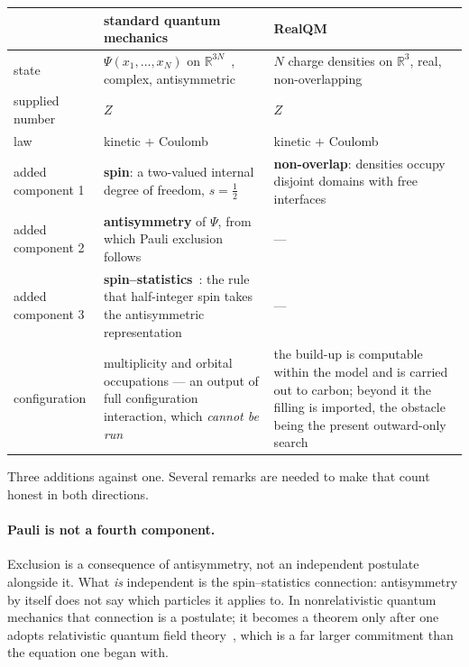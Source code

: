 \documentclass[11pt]{article}
\begin{document}
\begin{center}
\begin{tabular}{p{}p{}p{}}
\toprule
 & standard quantum mechanics & RealQM \\
\midrule
state & $\Psi(x_1,\dots,x_N)$ on $\mathbb{R}^{3N}$~\cite{Schrodinger1926}, complex, antisymmetric
      & $N$ charge densities on $\mathbb{R}^{3}$, real, non-overlapping \\
supplied number & $Z$ & $Z$ \\
law & kinetic $+$ Coulomb & kinetic $+$ Coulomb \\
\midrule
added component 1 & \textbf{spin}: a two-valued internal degree of freedom,
                    $s=\tfrac12$~\cite{UhlenbeckGoudsmit1925,Giulini2008}
                  & \textbf{non-overlap}: densities occupy disjoint domains with free interfaces \\
added component 2 & \textbf{antisymmetry} of $\Psi$, from which Pauli
                    exclusion~\cite{Pauli1925,PauliNobel} follows & --- \\
added component 3 & \textbf{spin--statistics}~\cite{Pauli1940}: the rule that half-integer
                    spin takes the antisymmetric representation & --- \\
\midrule
configuration & multiplicity and orbital occupations --- an output of full configuration
interaction, which \emph{cannot be run} & the build-up is computable within the model and is
carried out to carbon; beyond it the filling is imported, the obstacle being the present
outward-only search \\
\bottomrule
\end{tabular}
\end{center}

Three additions against one. Several remarks are needed to make that count honest in both
directions.

\paragraph{Pauli is not a fourth component.} Exclusion is a consequence of antisymmetry, not an
independent postulate alongside it. What \emph{is} independent is the spin--statistics connection:
antisymmetry by itself does not say which particles it applies to. In nonrelativistic quantum
mechanics that connection is a postulate; it becomes a theorem only after one adopts relativistic
quantum field theory~\cite{Pauli1940}, which is a far larger commitment than the equation one began with.
\end{document}
